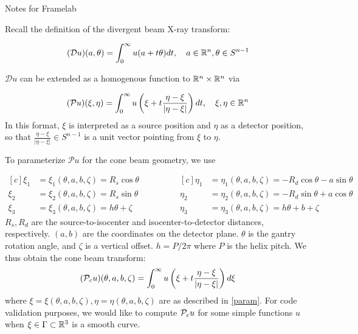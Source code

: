 \documentclass[12pt]{article}
\begin{document}
\begin{center}
Notes for Framelab
\end{center}

Recall the definition of the divergent beam X-ray transform: 

\begin{align*}
(\mathcal{D} u)(a,\theta) = \int_0^\infty u(a+t\theta)dt,\quad a\in\R^n,\theta\in S^{n-1}
\end{align*}

$\mathcal{D}u$ can be extended as a homogenous function to $\R^n\times \R^n$ via 

\begin{align*}
(\mathcal{P}u)(\xi,\eta) = \int_0^\infty u\left(\xi+t\frac{\eta-\xi}{\vert \eta-\xi\vert}\right) dt ,\quad \xi,\eta\in\R^n
\end{align*} In this format, $\xi$ is interpreted as a source position and $\eta$ as a detector position, so that $\frac{\eta-\xi}{\vert \eta-\xi\vert}\in S^{n-1}$ is a unit vector pointing from $\xi$ to $\eta$.  

To parameterize $\mathcal{P}u$ for the cone beam geometry, we use 

\begin{equation}
\begin{aligned}[c]
\xi_1 &= \xi_1(\theta,a,b,\zeta) = R_s\cos\theta \\
\xi_2 &= \xi_2(\theta,a,b,\zeta) = R_s\sin\theta \\
\xi_3 &= \xi_3(\theta,a,b,\zeta) = h\theta + \zeta
\end{aligned}\qquad \qquad
\begin{aligned}[c]
\eta_1 &= \eta_1(\theta,a,b,\zeta) = -R_d\cos\theta-a\sin\theta \\
\eta_2 &= \eta_2(\theta,a,b,\zeta) = -R_d\sin\theta+a\cos\theta \\
\eta_3 &= \eta_3(\theta,a,b,\zeta) = h\theta + b + \zeta 
\end{aligned} \label{param}
\end{equation} $R_s,R_d$ are the source-to-isocenter and isocenter-to-detector distances, respectively.  $(a,b)$ are the coordinates on the detector plane.  $\theta$ is the gantry rotation angle, and $\zeta$ is a vertical offset.  $h=P/2\pi$ where $P$ is the helix pitch.  We thus obtain the cone beam transform: 
\begin{align*}
(\P_cu)(\theta,a,b,\zeta) = \int_0^\infty u\left(\xi+t\frac{\eta-\xi}{\vert \eta-\xi\vert}\right)d\xi
\end{align*}where $\xi=\xi(\theta,a,b,\zeta),\eta=\eta(\theta,a,b,\zeta)$ are as described in \eqref{param}.  For code validation purposes, we would like to compute $\P_cu$ for some simple functions $u$ when $\xi\in \Gamma\subset\R^3$ is a smooth curve. 
\end{document}
